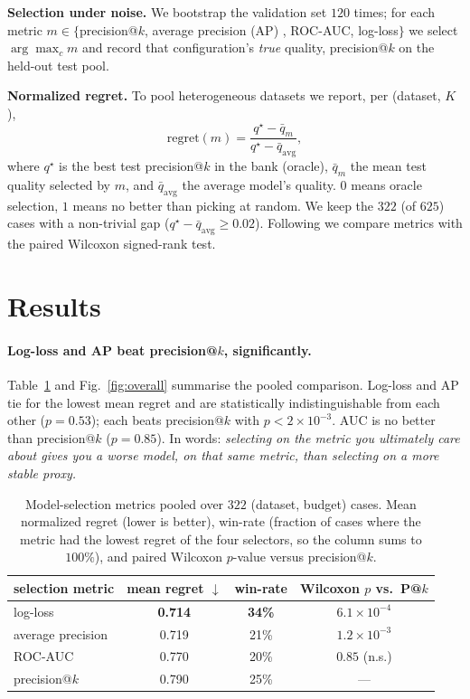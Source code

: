 \documentclass[11pt]{article}
\begin{document}
\textbf{Selection under noise.} We bootstrap \citep{efron1994bootstrap} the validation set
$120$ times; for each metric $m \in \{$precision@$k$, average precision (AP)
\citep{davis2006prroc}, ROC-AUC, log-loss$\}$ we select $\arg\max_c m$ and record that
configuration's \emph{true} quality, precision@$k$ on the held-out test pool.

\textbf{Normalized regret.} To pool heterogeneous datasets we report, per (dataset, $K$),
\begin{equation}
\mathrm{regret}(m) = \frac{q^\star - \bar q_m}{q^\star - \bar q_{\text{avg}}},
\end{equation}
where $q^\star$ is the best test precision@$k$ in the bank (oracle), $\bar q_m$ the mean test
quality selected by $m$, and $\bar q_{\text{avg}}$ the average model's quality. $0$ means
oracle selection, $1$ means no better than picking at random. We keep the $322$ (of $625$)
cases with a non-trivial gap ($q^\star-\bar q_{\text{avg}}\ge 0.02$). Following
\citet{demsar2006statistical} we compare metrics with the paired Wilcoxon signed-rank test.

\section{Results}\label{sec:results}

\paragraph{Log-loss and AP beat precision@$k$, significantly.}
Table~\ref{tab:main} and Fig.~\ref{fig:overall} summarise the pooled comparison. Log-loss and
AP tie for the lowest mean regret and are statistically indistinguishable from each other
($p=0.53$); each beats precision@$k$ with $p<2\times10^{-3}$. AUC is no better than
precision@$k$ ($p=0.85$). In words: \emph{selecting on the metric you ultimately care about
gives you a worse model, on that same metric, than selecting on a more stable proxy.}

\begin{table}[H]
\centering
\caption{Model-selection metrics pooled over $322$ (dataset, budget) cases. Mean normalized
regret (lower is better), win-rate (fraction of cases where the metric had the lowest regret of
the four selectors, so the column sums to $100\%$), and paired Wilcoxon $p$-value versus
precision@$k$.}
\label{tab:main}
\begin{tabular}{lccc}
\toprule
selection metric & mean regret $\downarrow$ & win-rate & Wilcoxon $p$ vs.\ P@$k$ \\
\midrule
log-loss          & \textbf{0.714} & \textbf{34\%} & $6.1\times10^{-4}$ \\
average precision & 0.719 & 21\% & $1.2\times10^{-3}$ \\
ROC-AUC           & 0.770 & 20\% & $0.85$ (n.s.) \\
precision@$k$     & 0.790 & 25\% & --- \\
\bottomrule
\end{tabular}
\end{table}
\end{document}
